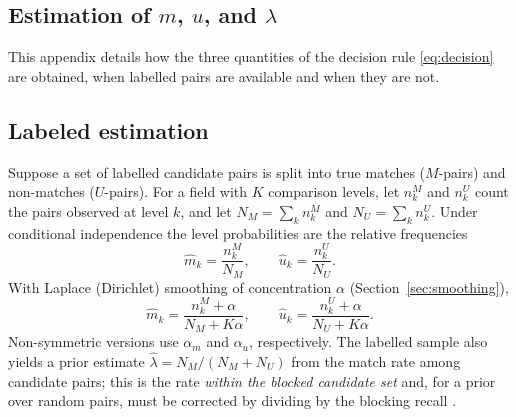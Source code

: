 \documentclass[conference]{IEEEtran}
\begin{document}
\begin{appendices}

\section{Estimation of $m$, $u$, and $\lambda$}
\label{app:estimation}
This appendix details how the three quantities of the decision rule
\eqref{eq:decision} are obtained, when labelled pairs are available and when they are not.

\subsection{Labeled estimation}
Suppose a set of labelled candidate pairs is split into true matches ($M$-pairs) and
non-matches ($U$-pairs). For a field with $K$ comparison levels, let $n_{k}^{M}$ and
$n_{k}^{U}$ count the pairs observed at level $k$, and let $N_M=\sum_k n_k^M$ and
$N_U=\sum_k n_k^U$. Under conditional independence the level probabilities are the
relative frequencies
\begin{equation}
\hat m_k=\frac{n_k^{M}}{N_M},\qquad \hat u_k=\frac{n_k^{U}}{N_U}.
\end{equation}
With Laplace (Dirichlet) smoothing of concentration $\alpha$ (Section~\ref{sec:smoothing}),
\begin{equation}
\hat m_k=\frac{n_k^{M}+\alpha}{N_M+K\alpha},\qquad
\hat u_k=\frac{n_k^{U}+\alpha}{N_U+K\alpha}.
\end{equation}
Non-symmetric versions use $\alpha_m$ and $\alpha_u$, respectively. The labelled sample also
yields a prior estimate $\hat\lambda=N_M/(N_M+N_U)$ from the match rate among candidate
pairs; this is the rate \emph{within the blocked candidate set} and, for a prior over
random pairs, must be corrected by dividing by the blocking recall
\cite{winkler2000}.


\end{appendices}
\end{document}
